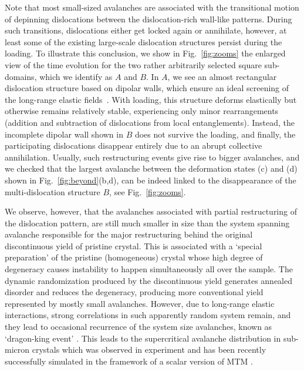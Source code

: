 \documentclass[CRPHYS,Unicode,manuscript]{cedram}
\begin{document}
Note that most small-sized avalanches are associated with the transitional motion of depinning dislocations between the dislocation-rich wall-like patterns. During such transitions, dislocations either get locked again or annihilate, however, at least some of the existing large-scale dislocation structures persist during the loading. To illustrate this conclusion, we show in Fig.~\ref{fig:zooms} the enlarged view of the time evolution for the two rather arbitrarily selected square sub-domains, which we identify as $A$ and $B$. In $A$, we see an almost rectangular dislocation structure based on dipolar walls, which ensure an ideal screening of the long-range elastic fields~\cite{Zaiser2013-ff}. With loading, this structure deforms elastically but otherwise remains relatively stable, experiencing only minor rearrangements (addition and subtraction of dislocations from local entanglements). Instead, the incomplete dipolar wall shown in $B$ does not survive the loading, and finally, the participating dislocations disappear entirely due to an abrupt collective annihilation. Usually, such restructuring events give rise to bigger avalanches, and we checked that the largest avalanche between the deformation states (c) and (d) shown in Fig.~\ref{fig:beyond}(b,d), can be indeed linked to the disappearance of the multi-dislocation structure $B$, see Fig.~\ref{fig:zooms}.



We observe, however, that the  avalanches  associated with partial restructuring of the dislocation pattern,  are  still much smaller in   size than  the system spanning avalanche responsible for the major restructuring behind the original discontinuous yield of pristine crystal. This is associated with a `special preparation' of the pristine (homogeneous) crystal whose  high  degree of  degeneracy causes instability to happen simultaneously all over the sample. The dynamic randomization produced by the discontinuous yield generates annealed disorder and  reduces the degeneracy,    producing more conventional yield represented by mostly small avalanches. However, due to long-range elastic interactions, strong  correlations in such apparently random system  remain, and they lead to occasional recurrence of the system size avalanches, known as `dragon-king event' \cite{Sornette2012-kh}.  This leads to the supercritical avalanche distribution in sub-micron crystals which was observed in experiment and has been recently  successfully simulated in the framework of  a scalar version of  MTM \cite{Zhang2020-ax}. 
\end{document}
